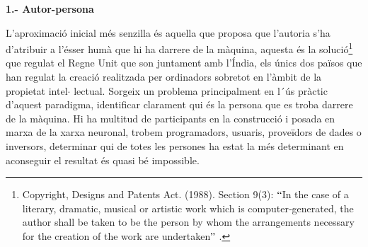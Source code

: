 \documentclass[12pt]{article}
\begin{document}
\vspace{\baselineskip}

\vspace{\baselineskip}
\textbf{1.- Autor-persona}\par


\vspace{\baselineskip}
\begin{justify}
L’aproximació inicial més senzilla és aquella que proposa que l’autoria s’ha d’atribuir a l’ésser humà que hi ha darrere de la màquina, aquesta és la solució\footnote{ Copyright, Designs and Patents Act. (1988). Section 9(3): $``$In the case of a literary, dramatic, musical or artistic work which is computer‐generated, the author shall be taken to be the person by whom the arrangements necessary for the creation of the work are undertaken$"$ . } que regulat el Regne Unit que son juntament amb l’Índia, els únics dos països que han regulat la creació realitzada per ordinadors sobretot en l’àmbit de la propietat intel$ \cdot $ lectual. Sorgeix un problema principalment en l´ús pràctic d’aquest paradigma, identificar clarament qui és la persona que es troba darrere de la màquina. Hi ha multitud de participants en la construcció i posada en marxa de la xarxa neuronal, trobem programadors, usuaris, proveïdors de dades o inversors, determinar qui de totes les persones ha estat la més determinant en aconseguir el resultat és quasi bé impossible.
\end{justify}\par
\end{document}
